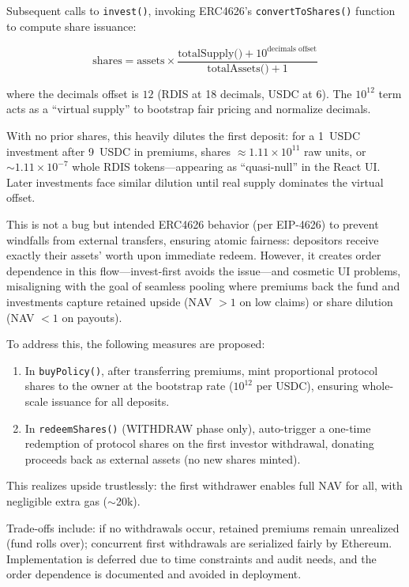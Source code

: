 \documentclass[11pt,a4paper]{article}
\begin{document}
        Subsequent calls to \texttt{invest()}, invoking ERC4626's \texttt{convertToShares()} function to compute share issuance:

        \[
        \text{shares} = \text{assets} \times \frac{\text{totalSupply()} + 10^{\text{decimals offset}}}{\text{totalAssets()} + 1}
        \]

        where the decimals offset is $12$ (RDIS at 18 decimals, USDC at 6).
        The $10^{12}$ term acts as a ``virtual supply'' to bootstrap fair pricing and normalize decimals.

        With no prior shares, this heavily dilutes the first deposit: for a 1~USDC investment after 9~USDC in premiums, shares $\approx 1.11 \times 10^{11}$ raw units, or $\sim 1.11 \times 10^{-7}$ whole RDIS tokens---appearing as ``quasi-null'' in the React UI.
        Later investments face similar dilution until real supply dominates the virtual offset.

        This is not a bug but intended ERC4626 behavior (per EIP-4626) to prevent windfalls from external transfers, ensuring atomic fairness: depositors receive exactly their assets' worth upon immediate redeem.
        However, it creates order dependence in this flow---invest-first avoids the issue---and cosmetic UI problems, misaligning with the goal of seamless pooling where premiums back the fund and investments capture retained upside (NAV $> 1$ on low claims) or share dilution (NAV $< 1$ on payouts).

        To address this, the following measures are proposed:
        \begin{enumerate}
        \item In \texttt{buyPolicy()}, after transferring premiums, mint proportional protocol shares to the owner at the bootstrap rate ($10^{12}$ per USDC), ensuring whole-scale issuance for all deposits.
        \item In \texttt{redeemShares()} (WITHDRAW phase only), auto-trigger a one-time redemption of protocol shares on the first investor withdrawal, donating proceeds back as external assets (no new shares minted).
        \end{enumerate}
        This realizes upside trustlessly: the first withdrawer enables full NAV for all, with negligible extra gas ($\sim$20k).

        Trade-offs include: if no withdrawals occur, retained premiums remain unrealized (fund rolls over); concurrent first withdrawals are serialized fairly by Ethereum.
        Implementation is deferred due to time constraints and audit needs, and the order dependence is documented and avoided in deployment.
\end{document}
